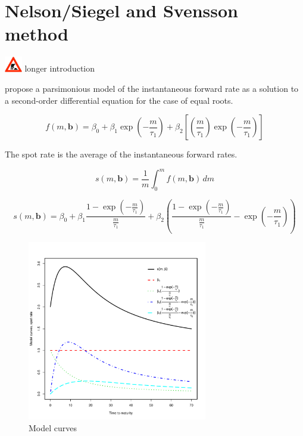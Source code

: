 \section{Nelson/Siegel and Svensson method}
\label{sec:nels-svenss-meth}

\includegraphics[width=0.3in]{baustelle} longer introduction

\cite{Nelson1987} propose a parsimonious  model of  the instantaneous forward rate as a solution to a second-order differential equation for the case of equal roots.

\begin{equation}
  \label{eq:laguerre}
  f(m,\bm{b}) = \beta_0+\beta_1\exp\left(-\frac{m}{\tau_1}\right)+\beta_2\left[\left(\frac{m}{\tau_1}\right)\exp\left(-\frac{m}{\tau_1}\right)\right]
\end{equation}


The spot rate is the average of the instantaneous forward rates. 

\begin{equation}
  \label{eq:intspotrate}
  s(m,\bm{b})=\frac{1}{m}\int_0^mf(m,\bm{b})\,dm
\end{equation}


\begin{equation}
  \label{eq:nelson-spot}
   s(m,\bm{b}) = \beta_0 + \beta_1\frac{1-\exp(-\frac{m}{\tau_1})}{\frac{m}{\tau_1}} + \beta_2\left(\frac{1-\exp(-\frac{m}{\tau_1})}{\frac{m}{\tau_1}} - \exp(-\frac{m}{\tau_1})\right)
\end{equation}



\begin{figure}[htb]
  \label{fig:curveshape}
  \caption{Model curves}
\begin{center}
\includegraphics[width=0.7\textwidth]{curveshape}
\end{center}
\end{figure}


